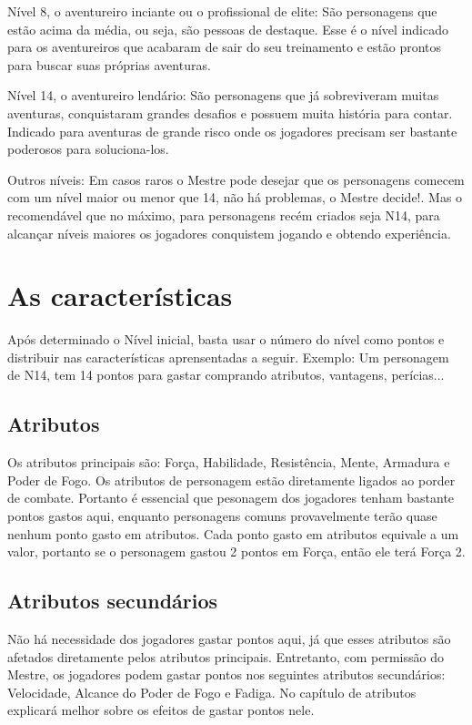 Nível 8, o aventureiro inciante ou o profissional de elite: São personagens que estão acima da média, ou seja, são pessoas de destaque. Esse é o nível indicado para os aventureiros que acabaram de sair do seu treinamento e estão prontos para buscar suas próprias aventuras.

Nível 14, o aventureiro lendário: São personagens que já sobreviveram muitas aventuras, conquistaram grandes desafios e possuem muita história para contar. Indicado para aventuras de grande risco onde os jogadores precisam ser bastante poderosos para soluciona-los.

Outros níveis: Em casos raros o Mestre pode desejar que os personagens comecem com um nível maior ou menor que 14, não há problemas, o Mestre decide!. Mas o recomendável que no máximo, para personagens recém criados seja N14, para alcançar níveis maiores os jogadores conquistem jogando e obtendo experiência.

\section{As características}

Após determinado o Nível inicial, basta usar o número do nível como pontos e distribuir nas características aprensentadas a seguir. Exemplo: Um personagem de N14, tem 14 pontos para gastar comprando atributos, vantagens, perícias...

\subsection{Atributos}

Os atributos principais são: Força, Habilidade, Resistência, Mente, Armadura e Poder de Fogo. Os atributos de personagem estão diretamente ligados ao porder de combate. Portanto é essencial que pesonagem dos jogadores tenham bastante pontos gastos aqui, enquanto personagens comuns provavelmente terão quase nenhum ponto gasto em atributos. Cada ponto gasto em atributos equivale a um valor, portanto se o personagem gastou 2 pontos em Força, então ele terá Força 2.

\subsection{Atributos secundários}

Não há necessidade dos jogadores gastar pontos aqui, já que esses atributos são afetados diretamente pelos atributos principais. Entretanto, com permissão do Mestre, os jogadores podem gastar pontos nos seguintes atributos secundários: Velocidade, Alcance do Poder de Fogo e Fadiga. No capítulo de atributos explicará melhor sobre os efeitos de gastar pontos nele.

